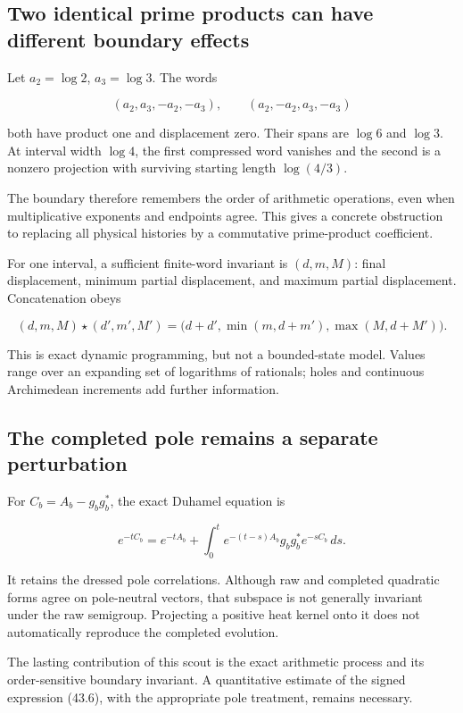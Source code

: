 \documentclass[
  10pt,
  a4paper,
  10pt,
  oneside,
  openany]{book}
\begin{document}
\subsection{Two identical prime products can have different boundary
effects}\label{two-identical-prime-products-can-have-different-boundary-effects}

Let \(a_2=\log2\), \(a_3=\log3\). The words

\[
 (a_2,a_3,-a_2,-a_3),\qquad
 (a_2,-a_2,a_3,-a_3)
\]

both have product one and displacement zero. Their spans are \(\log6\)
and \(\log3\). At interval width \(\log4\), the first compressed word
vanishes and the second is a nonzero projection with surviving starting
length \(\log(4/3)\).

The boundary therefore remembers the order of arithmetic operations,
even when multiplicative exponents and endpoints agree. This gives a
concrete obstruction to replacing all physical histories by a
commutative prime-product coefficient.

For one interval, a sufficient finite-word invariant is \((d,m,M)\):
final displacement, minimum partial displacement, and maximum partial
displacement. Concatenation obeys

\[
 (d,m,M)\star(d',m',M')
 =\bigl(d+d',\min(m,d+m'),\max(M,d+M')\bigr).
 \tag{43.7}\label{eq:43.7}
\]

This is exact dynamic programming, but not a bounded-state model. Values
range over an expanding set of logarithms of rationals; holes and
continuous Archimedean increments add further information.

\subsection{The completed pole remains a separate
perturbation}\label{the-completed-pole-remains-a-separate-perturbation}

For \(C_b=A_b-g_bg_b^{*}\), the exact Duhamel equation is

\[
 e^{-tC_b}=e^{-tA_b}+
 \int_0^t e^{-(t-s)A_b}g_bg_b^{*}e^{-sC_b}\,ds.
 \tag{43.8}\label{eq:43.8}
\]

It retains the dressed pole correlations. Although raw and completed
quadratic forms agree on pole-neutral vectors, that subspace is not
generally invariant under the raw semigroup. Projecting a positive heat
kernel onto it does not automatically reproduce the completed evolution.

The lasting contribution of this scout is the exact arithmetic process
and its order-sensitive boundary invariant. A quantitative estimate of
the signed expression (43.6), with the appropriate pole treatment,
remains necessary.
\end{document}
